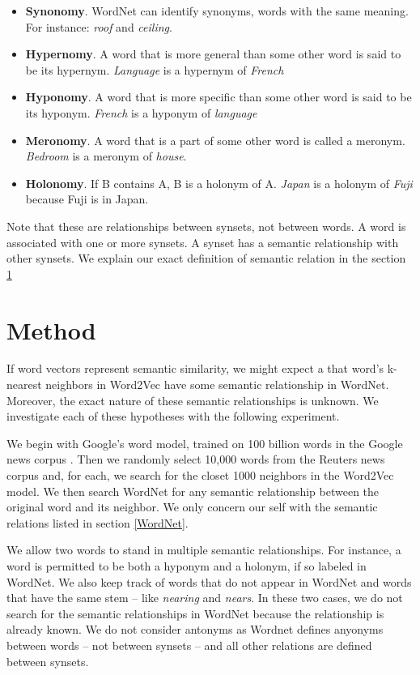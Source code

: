\documentclass{article}
\begin{document}
\begin{itemize}

  \item \textbf{Synonomy}. WordNet can identify synonyms, words with the same meaning. For instance: \textit{roof} and \textit{ceiling}.
  \item \textbf{Hypernomy}. A word that is more general than some other word is said to be its hypernym. \textit{Language} is a hypernym of \textit{French}
  \item \textbf{Hyponomy}. A word that is more specific than some other word is said to be its hyponym. \textit{French} is a hyponym of \textit{language}
  \item \textbf{Meronomy}. A word that is a part of some other word is called a meronym. \textit{Bedroom} is a meronym of \textit{house}.
  \item \textbf{Holonomy}. If B contains A, B is a holonym of A. \textit{Japan} is a holonym of \textit{Fuji} because Fuji is in Japan.
\end{itemize}

Note that these are relationships between synsets, not between words. A word is associated with one or more synsets. A synset has a semantic relationship with other synsets. We explain our exact definition of semantic relation in the section \ref{method}

\section{Method} \label{method}
If word vectors represent semantic similarity, we might expect a that word's k-nearest neighbors in Word2Vec have some semantic relationship in WordNet. Moreover, the exact nature of these semantic relationships is unknown. We investigate each of these hypotheses with the following experiment. 

We begin with Google's word model, trained on 100 billion words in the Google news corpus \cite{Word2VecWebsite}. Then we randomly select 10,000 words from the Reuters news corpus and, for each, we search for the closet 1000 neighbors in the Word2Vec model. We then search WordNet for any semantic relationship between the original word and its neighbor. We only concern our self with the semantic relations listed in section \ref{WordNet}. 

We allow two words to stand in multiple semantic relationships. For instance, a word is permitted to be both a hyponym and a holonym, if so labeled in WordNet. We also keep track of words that do not appear in WordNet and words that have the same stem -- like \textit{nearing} and \textit{nears}. In these two cases, we do not search for the semantic relationships in WordNet because the relationship is already known. We do not consider antonyms as Wordnet defines anyonyms between words -- not between synsets -- and all other relations are defined between synsets. 
\end{document}

